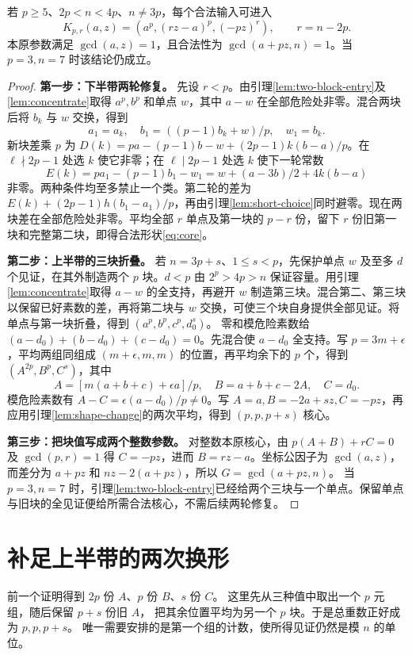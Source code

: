 \begin{proposition}[一般输入的三块归约]\label{prop:entry}
若 $p\ge5$、$2p<n<4p$、$n\ne3p$，每个合法输入可进入
\begin{equation}\label{eq:core}
K_{p,r}(a,z)=(a^p,(rz-a)^p,(-pz)^r),\qquad r=n-2p.
\end{equation}
本原参数满足 $\gcd(a,z)=1$，且合法性为 $\gcd(a+pz,n)=1$。当 $p=3,n=7$ 时该结论仍成立。
\end{proposition}
\begin{proof}
\par\noindent\textbf{第一步：下半带两轮修复。} 先设 $r<p$。由引理\ref{lem:two-block-entry}及\ref{lem:concentrate}取得 $a^p,b^p$ 和单点 $w$，其中 $a-w$ 在全部危险处非零。混合两块后将 $b_k$ 与 $w$ 交换，得到
\[
a_1=a_k,\quad b_1=((p-1)b_k+w)/p,\quad w_1=b_k.
\]
新块差乘 $p$ 为 $D(k)=pa-(p-1)b-w+(2p-1)k(b-a)/p$。在 $\ell\nmid2p-1$ 处选 $k$ 使它非零；在 $\ell\mid2p-1$ 处选 $k$ 使下一轮常数
\[E(k)=pa_1-(p-1)b_1-w_1=w+(a-3b)/2+4k(b-a)
\]
非零。两种条件均至多禁止一个类。第二轮的差为 $E(k)+(2p-1)h(b_1-a_1)/p$，再由引理\ref{lem:short-choice}同时避零。现在两块差在全部危险处非零。平均全部 $r$ 单点及第一块的 $p-r$ 份，留下 $r$ 份旧第一块和完整第二块，即得合法形状\eqref{eq:core}。

\par\noindent\textbf{第二步：上半带的三块折叠。}
若 $n=3p+s$、$1\le s<p$，先保护单点 $w$ 及至多 $d$ 个见证，在其外制造两个 $p$ 块。$d<p$ 由 $2^p>4p>n$ 保证容量。用引理\ref{lem:concentrate}取得 $a-w$ 的全支持，再避开 $w$ 制造第三块。混合第二、第三块以保留已好素数的差，再将第二块与 $w$ 交换，可使三个块自身提供全部见证。将单点与第一块折叠，得到 $(a^p,b^p,c^p,d_0^s)$。
零和模危险素数给 $(a-d_0)+(b-d_0)+(c-d_0)=0$。先混合使 $a-d_0$ 全支持。写 $p=3m+\epsilon$，平均两组同组成 $(m+\epsilon,m,m)$ 的位置，再平均余下的 $p$ 个，得到 $(A^{2p},B^p,C^s)$，其中
\[
A=[m(a+b+c)+\epsilon a]/p,\quad B=a+b+c-2A,\quad C=d_0.
\]
模危险素数有 $A-C=\epsilon(a-d_0)/p\ne0$。写 $A=a,B=-2a+sz,C=-pz$，再应用引理\ref{lem:shape-change}的两次平均，得到 $(p,p,p+s)$ 核心。
\par\noindent\textbf{第三步：把块值写成两个整数参数。}
对整数本原核心，由 $p(A+B)+rC=0$ 及 $\gcd(p,r)=1$ 得 $C=-pz$，进而 $B=rz-a$。坐标公因子为 $\gcd(a,z)$，而差分为 $a+pz$ 和 $nz-2(a+pz)$，所以 $G=\gcd(a+pz,n)$。
当 $p=3,n=7$ 时，引理\ref{lem:two-block-entry}已经给两个三块与一个单点。保留单点与旧块的全见证便给所需合法核心，不需后续两轮修复。
\end{proof}


\section{补足上半带的两次换形}
前一个证明得到 $2p$ 份 $A$、$p$ 份 $B$、$s$ 份 $C$。
这里先从三种值中取出一个 $p$ 元组，随后保留 $p+s$ 份旧 $A$，
把其余位置平均为另一个 $p$ 块。于是总重数正好成为 $p,p,p+s$。
唯一需要安排的是第一个组的计数，使所得见证仍然是模 $n$ 的单位。

